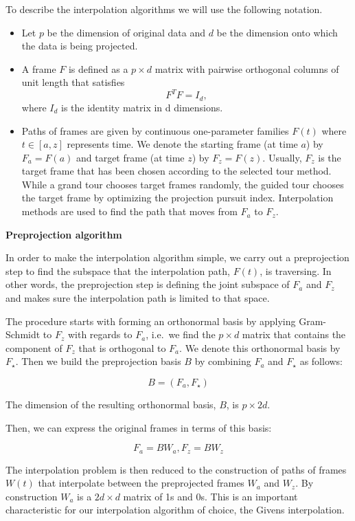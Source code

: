To describe the interpolation algorithms we will use the following notation.

\begin{itemize}
\item
  Let \(p\) be the dimension of original data and \(d\) be the dimension onto which the data is being projected.
\item
  A frame \(F\) is defined as a \(p\times d\) matrix with pairwise orthogonal columns of unit length that satisfies
  \[F^TF = I_d,\]
  where \(I_d\) is the identity matrix in d dimensions.
\item
  Paths of frames are given by continuous one-parameter families \(F(t)\) where \(t\in [a, z]\) represents time. We denote the starting frame (at time \(a\)) by \(F_a = F(a)\) and target frame (at time \(z\)) by \(F_z = F(z)\). Usually, \(F_z\) is the target frame that has been chosen according to the selected tour method. While a grand tour chooses target frames randomly, the guided tour chooses the target frame by optimizing the projection pursuit index. Interpolation methods are used to find the path that moves from \(F_a\) to \(F_z\).
\end{itemize}

\textbf{Preprojection algorithm}

In order to make the interpolation algorithm simple, we carry out a preprojection step to find the subspace that the interpolation path, \(F(t)\), is traversing. In other words, the preprojection step is defining the joint subspace of \(F_a\) and \(F_z\) and makes sure the interpolation path is limited to that space.

The procedure starts with forming an orthonormal basis by applying Gram-Schmidt to \(F_z\) with regards to \(F_a\), i.e.~we find the \(p\times d\) matrix that contains the component of \(F_z\) that is orthogonal to \(F_a\). We denote this orthonormal basis by \(F_\star\). Then we build the preprojection basis \(B\) by combining \(F_a\) and \(F_\star\) as follows:

\[B = (F_a, F_{\star})\]

The dimension of the resulting orthonormal basis, \(B\), is \(p\times 2d\).

Then, we can express the original frames in terms of this basis:

\[F_a = B W_a, F_z = B W_z\]

The interpolation problem is then reduced to the construction of paths of frames \(W(t)\) that interpolate between the preprojected frames \(W_a\) and \(W_z\). By construction \(W_a\) is a \(2d\times d\) matrix of 1s and 0s. This is an important characteristic for our interpolation algorithm of choice, the Givens interpolation.

